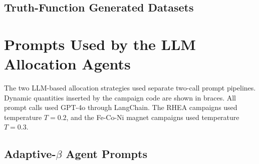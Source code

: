 \subsection{Truth-Function Generated Datasets}
\label{app:truth_datasets}

\section{Prompts Used by the LLM Allocation Agents}
\label{app:prompts}

\noindent The two LLM-based allocation strategies used separate two-call prompt
pipelines. Dynamic quantities inserted by the campaign code are shown in braces.
All prompt calls used GPT-4o through LangChain. The RHEA campaigns used
temperature $T = 0.2$, and the Fe-Co-Ni magnet campaigns used temperature
$T = 0.3$.

\subsection{Adaptive-\texorpdfstring{$\beta$}{β} Agent Prompts}
\label{app:prompts_adaptive_beta}

